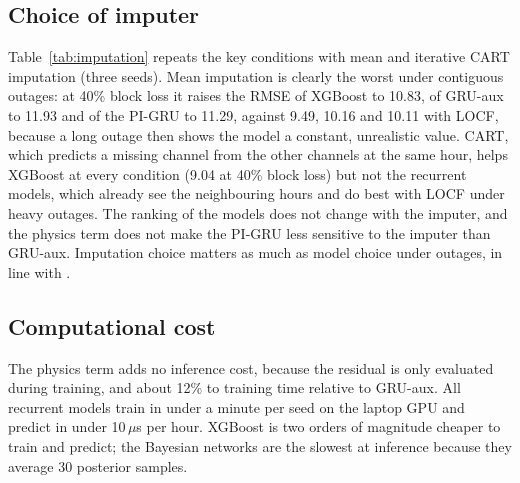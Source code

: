 \subsection{Choice of imputer}\label{sec:eval_imp}


Table~\ref{tab:imputation} repeats the key conditions with mean and iterative CART imputation (three seeds). Mean imputation is clearly the worst under contiguous outages: at 40\% block loss it raises the RMSE of XGBoost to 10.83, of GRU-aux to 11.93 and of the PI-GRU to 11.29, against 9.49, 10.16 and 10.11 with LOCF, because a long outage then shows the model a constant, unrealistic value. CART, which predicts a missing channel from the other channels at the same hour, helps XGBoost at every condition (9.04 at 40\% block loss) but not the recurrent models, which already see the neighbouring hours and do best with LOCF under heavy outages. The ranking of the models does not change with the imputer, and the physics term does not make the PI-GRU less sensitive to the imputer than GRU-aux. Imputation choice matters as much as model choice under outages, in line with \citet{lee2024missing}.

\subsection{Computational cost}\label{sec:eval_cost}


The physics term adds no inference cost, because the residual is only evaluated during training, and about 12\% to training time relative to GRU-aux. All recurrent models train in under a minute per seed on the laptop GPU and predict in under 10\,$\mu$s per hour. XGBoost is two orders of magnitude cheaper to train and predict; the Bayesian networks are the slowest at inference because they average 30 posterior samples.

